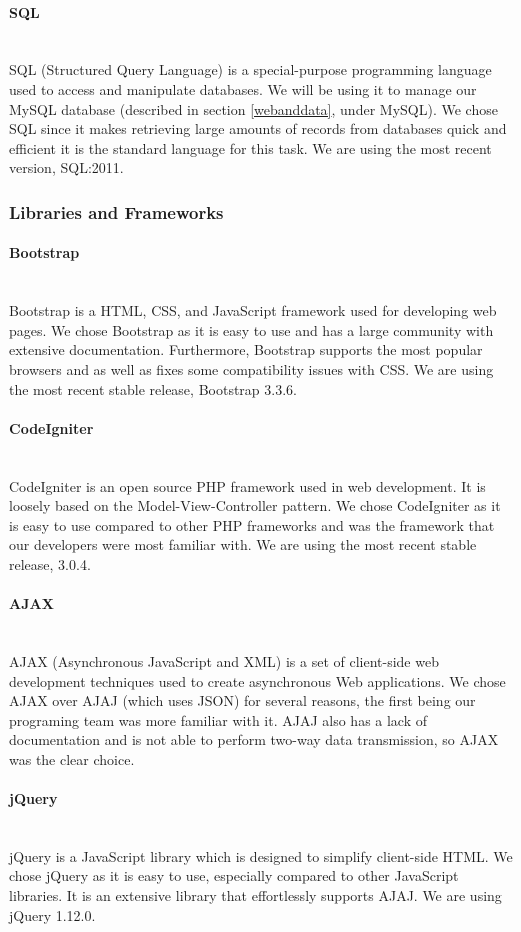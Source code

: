 \documentclass[12pt]{article}
\begin{document}
\paragraph*{SQL}~\\
SQL (Structured Query Language) is a special-purpose programming language used to access and manipulate databases. We will be using it to manage our MySQL database (described in section \ref{webanddata}, under MySQL). We chose SQL since it makes retrieving large amounts of records from databases quick and efficient it is the standard language for this task. We are using the most recent version, SQL:2011.
%
%
%
\subsubsection{Libraries and Frameworks}\label{framworks}
\paragraph*{Bootstrap}~\\
Bootstrap is a HTML, CSS, and JavaScript framework used for developing web pages. We chose Bootstrap as it is easy to use and has a large community with extensive documentation. Furthermore, Bootstrap supports the most popular browsers and as well as fixes some compatibility issues with CSS. We are using the most recent stable release, Bootstrap 3.3.6.
%
\paragraph*{CodeIgniter}~\\
CodeIgniter is an open source PHP framework used in web development. It is loosely based on the Model-View-Controller pattern. We chose CodeIgniter as it is easy to use compared to other PHP frameworks and was the framework that our developers were most familiar with. We are using the most recent stable release, 3.0.4.
%
\paragraph*{AJAX}~\\
AJAX (Asynchronous JavaScript and XML) is a set of client-side web development techniques used to create asynchronous Web applications. We chose AJAX over AJAJ (which uses JSON) for several reasons, the first being our programing team was more familiar with it. AJAJ also has a lack of documentation and is not able to perform two-way data transmission, so AJAX was the clear choice.
%
\paragraph*{jQuery}~\\
jQuery is a JavaScript library which is designed to simplify client-side HTML. We chose jQuery as it is easy to use, especially compared to other JavaScript libraries. It is an extensive library that effortlessly supports AJAJ. We are using jQuery 1.12.0.
%
\end{document}
